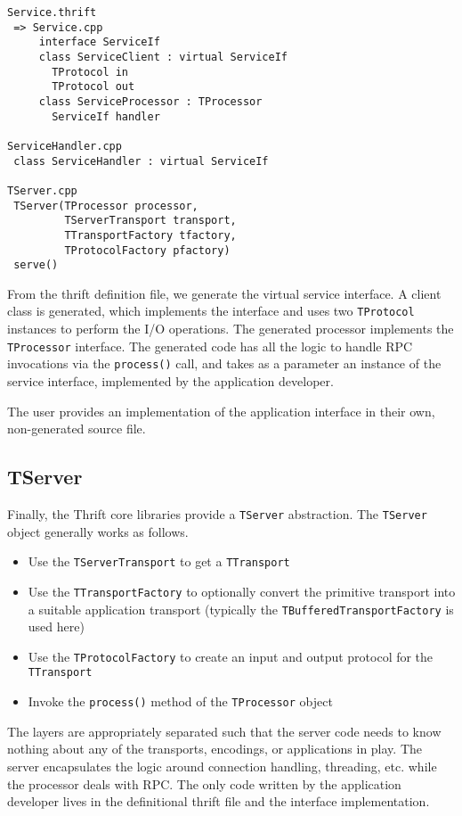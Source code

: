 \documentclass[nocopyrightspace,blockstyle]{sigplanconf}
\begin{document}
\begin{verbatim}
Service.thrift
 => Service.cpp
     interface ServiceIf
     class ServiceClient : virtual ServiceIf
       TProtocol in
       TProtocol out
     class ServiceProcessor : TProcessor
       ServiceIf handler

ServiceHandler.cpp
 class ServiceHandler : virtual ServiceIf

TServer.cpp
 TServer(TProcessor processor,
         TServerTransport transport,
         TTransportFactory tfactory,
         TProtocolFactory pfactory)
 serve()
\end{verbatim}

From the thrift definition file, we generate the virtual service interface.
A client class is generated, which implements the interface and
uses two \texttt{TProtocol} instances to perform the I/O operations. The
generated processor implements the \texttt{TProcessor} interface. The generated
code has all the logic to handle RPC invocations via the \texttt{process()}
call, and takes as a parameter an instance of the service interface,
implemented by the application developer.

The user provides an implementation of the application interface in their own,
non-generated source file.

\subsection{TServer}

Finally, the Thrift core libraries provide a \texttt{TServer} abstraction.
The \texttt{TServer} object generally works as follows.

\begin{itemize}
\item Use the \texttt{TServerTransport} to get a \texttt{TTransport}
\item Use the \texttt{TTransportFactory} to optionally convert the primitive
transport into a suitable application transport (typically the
\texttt{TBufferedTransportFactory} is used here)
\item Use the \texttt{TProtocolFactory} to create an input and output protocol
for the \texttt{TTransport}
\item Invoke the \texttt{process()} method of the \texttt{TProcessor} object
\end{itemize}

The layers are appropriately separated such that the server code needs to know
nothing about any of the transports, encodings, or applications in play. The
server encapsulates the logic around connection handling, threading, etc.
while the processor deals with RPC. The only code written by the application
developer lives in the definitional thrift file and the interface
implementation.
\end{document}
